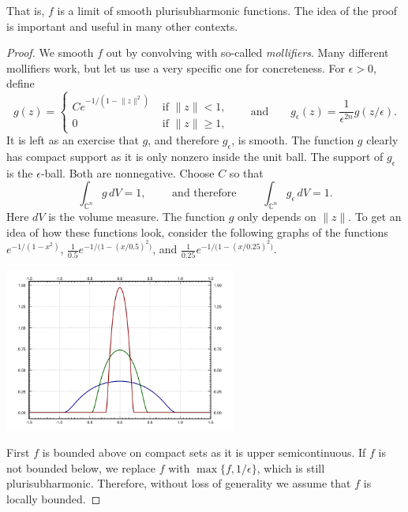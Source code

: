 \documentclass[12pt,openany]{book}
\newcommand{\snorm}[1]{\lVert {#1} \rVert}
\newcommand{\C}{{\mathbb{C}}}
\theoremstyle{plain}
\theoremstyle{remark}
\theoremstyle{definition}
\theoremstyle{exercise}
\theoremstyle{example}
\begin{document}
That is, $f$ is a limit of smooth plurisubharmonic functions.
The idea of the proof is important and useful in many other
contexts.

\begin{proof}
We smooth $f$ out by convolving with so-called
\emph{mollifiers}.  Many different mollifiers 
work, but let us use a very specific one for concreteness.
For $\epsilon > 0$, define 
\begin{equation*}
g(z) = 
\begin{cases}
C e^{-1/(1-\snorm{z}^2)} & \text{ if $\snorm{z} < 1$,}
\\
0 & \text{ if $\snorm{z} \geq 1$,}
\end{cases}
\qquad
\text{and}
\qquad
g_\epsilon(z) = \frac{1}{\epsilon^{2n}} g(z/\epsilon) .
\end{equation*}
It is left as an exercise that $g$, and therefore $g_\epsilon$, is smooth.
The function $g$ clearly has compact
support as it is only nonzero inside the unit ball.  The support of
$g_\epsilon$ is the $\epsilon$-ball.  Both are nonnegative.  Choose $C$ so that
\begin{equation*}
\int_{\C^n} g\, dV = 1 ,
\qquad \text{ and therefore } \qquad
\int_{\C^n} g_\epsilon\, dV = 1 .
\end{equation*}
%
Here $dV$ is the volume measure.
The function $g$ only depends on $\snorm{z}$.  To get an idea of
how these functions look, consider the following graphs of the
functions $e^{-1/(1-x^2)}$,
$\frac{1}{0.5}e^{-1/\bigl(1-{(x/0.5)}^2\bigr)}$, and
$\frac{1}{0.25}e^{-1/\bigl(1-{(x/0.25)}^2\bigr)}$.

\begin{center}
\includegraphics[width=3.0in]{figures/graph-of-mollifier.pdf}
\end{center}

First $f$ is bounded above on compact sets as it is upper semicontinuous.
If $f$ is not bounded below, we replace $f$ with $\max \{ f , 1/\epsilon
\}$, which is still plurisubharmonic.  Therefore, without loss of generality
we assume that $f$ is locally bounded.


\end{proof}
\end{document}
